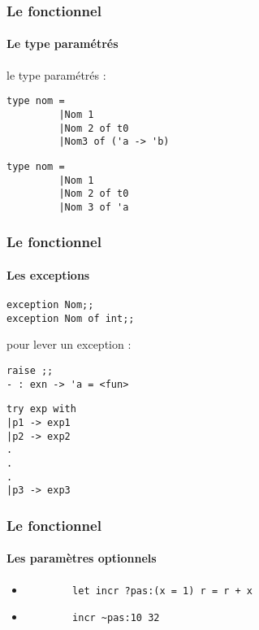 \begin{frame}[fragile]
  \frametitle{Le fonctionnel}
  \framesubtitle{Le type paramétrés}
  le type paramétrés :
  \begin{lstlisting}
type nom =
         |Nom 1
         |Nom 2 of t0
         |Nom3 of ('a -> 'b)
  \end{lstlisting}
  \begin{lstlisting}
type nom = 
         |Nom 1 
         |Nom 2 of t0
         |Nom 3 of 'a 
  \end{lstlisting}
\end{frame}

\begin{frame}[fragile]
  \frametitle{Le fonctionnel}
  \framesubtitle{Les exceptions}
  \begin{lstlisting}
exception Nom;;
exception Nom of int;;
  \end{lstlisting}
pour lever un exception : 
\begin{lstlisting}
raise ;;
- : exn -> 'a = <fun>
\end{lstlisting}
\begin{lstlisting}
try exp with 
|p1 -> exp1
|p2 -> exp2
.
.
.
|p3 -> exp3
\end{lstlisting}

\end{frame}

\begin{frame}[fragile]
	\frametitle{Le fonctionnel}
	\framesubtitle{Les paramètres optionnels}
	\begin{itemize}	

	\item 	\begin{lstlisting}
		let incr ?pas:(x = 1) r = r + x
		\end{lstlisting}

	\item 	\begin{lstlisting}
		incr ~pas:10 32
		\end{lstlisting}

\end{itemize}
\end{frame}
